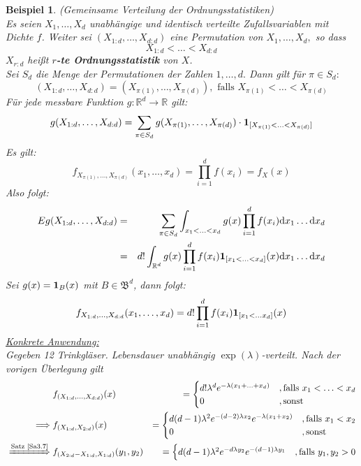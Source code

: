 \documentclass[a4paper,11pt]{book}
\newcommand{\R}{{\mathbb R}}
\newcommand{\ind}{\text{\bf{1}}}
\def\BB{ \mathfrak{B} }
\def\folgt{\ensuremath{\implies}}
\newcommand{\folgtnach}[1]{\ensuremath{\DOTSB\;\xRightarrow{\text{#1}}\;}}
\def\d{\mbox{d}}
\newtheorem{Bsp}{Beispiel}[chapter]
\theoremstyle{nonumberplain}
\begin{document}
\begin{Bsp} \label{Bsp3.5} (Gemeinsame Verteilung der Ordnungsstatistiken)\\
Es seien $X_1,\ldots,X_d$ unabhängige und identisch verteilte Zufallsvariablen mit Dichte $f$. Weiter sei $(X_{1:d}, \ldots, X_{d:d})$ eine Permutation von $X_1, \ldots,X_d,$ so dass
$$X_{1:d}<\ldots<X_{d:d}$$
$X_{r:d}$ heißt \textbf{$r$-te Ordnungsstatistik}  von $X$.\\
Sei $S_d$ die Menge der Permutationen der Zahlen $1,\ldots, d.$ Dann gilt für $\pi\in S_d:$
$$(X_{1:d},\ldots,X_{d:d})=(X_{\pi(1)},\ldots, X_{\pi(d)}), \text{ falls } X_{\pi(1)}<\ldots<X_{\pi(d)}$$
Für jede messbare Funktion $g:\R^d\to\R$ gilt:
$$g(X_{1:d},\ldots,X_{d:d})=\sum_{\pi\in S_d}g(X_{\pi(1)},\ldots,X_{\pi(d)})\cdot\ind_{[X_{\pi(1)}<\ldots<X_{\pi(d)}]}$$
Es gilt:
$$f_{X_{\pi(1)},\ldots,X_{\pi(d)}}(x_1,\ldots,x_d)=\prod_{i=1}^d f(x_i) = f_X(x)$$
Also folgt:
\begin{eqnarray*}
Eg(X_{1:d},\ldots,X_{d:d})&=&\sum_{\pi\in S_d}\int_{x_1<\ldots<x_d} g(x)\prod_{i=1}^d f(x_i)\d x_1\ldots\d x_d\\
&=&d!\int_{\R^d}g(x)\prod_{i=1}^d f(x_i)\ind_{[x_1<\ldots<x_d]}(x)\d x_1\ldots\d x_d\\
\end{eqnarray*}
Sei $g(x)=\ind_B(x)$ mit $B\in\BB^d$, dann folgt:
$$f_{X_{1:d},\ldots,X_{d:d}}(x_1,\ldots,x_d)=d!\prod_{i=1}^d f(x_i)\ind_{[x_1<\ldots x_d]}(x)$$
\underline{Konkrete Anwendung:}\\
Gegeben 12 Trinkgläser. Lebensdauer unabhängig $\exp(\lambda)$-verteilt. Nach der vorigen Überlegung gilt
\begin{eqnarray*}
&f_{(X_{1:d},\ldots,X_{d:d})}(x)&=\begin{cases}
d!\lambda^d e^{-\lambda(x_1+\ldots+x_d)} &,\text{falls } x_1<\ldots<x_d\\
0&,\text{sonst}
\end{cases}\\
\folgt&f_{(X_{1:d},X_{2:d})}(x)&=\begin{cases}
d(d-1)\lambda^2 e^{-(d-2)\lambda x_2} e^{-\lambda(x_1+x_2)} &,\text{falls } x_1<x_2\\
0&,\text{sonst}
\end{cases}\\
\folgtnach{Satz \ref{Sa3.7}}&f_{(X_{2:d}-X_{1:d},X_{1:d})}(y_1,y_2)&=\begin{cases}
d(d-1)\lambda^2 e^{-d\lambda y_2} e^{-(d-1)\lambda y_1} &,\text{falls } y_1,y_2>0\\

\end{cases}
\end{eqnarray*}
\end{Bsp}
\end{document}
